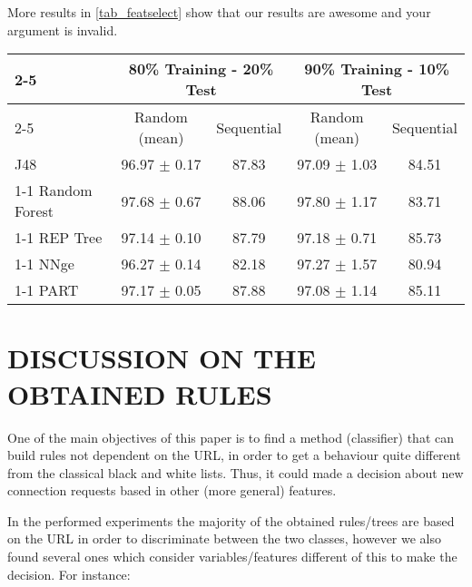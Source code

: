 \documentclass{llncs}
\begin{document}


More results in \ref{tab_featselect} show that our results are awesome and your argument is invalid.

\begin{table*}[htpb]
\centering
 \caption{\label{tab_featselect} Percentage of correctly classified patterns for non-balanced data}
{\small
\begin{tabular}{|l|c|c|c|c|}
\cline{2-5}
\multicolumn{1}{l|}{} & \multicolumn{2}{c|}{80\% Training - 20\% Test} & \multicolumn{2}{c|}{90\% Training - 10\% Test} \\ 
\cline{2-5}
\multicolumn{1}{l|}{} & Random (mean) & Sequential & Random (mean) & Sequential \\ 
\hline
J48 & 96.97 $\pm$ 0.17 & 87.83 & 97.09 $\pm$ 1.03 & 84.51 \\ 
\cline{1-1}
Random Forest & 97.68 $\pm$ 0.67 & 88.06 & 97.80 $\pm$ 1.17 & 83.71 \\ 
\cline{1-1}
REP Tree & 97.14 $\pm$ 0.10 & 87.79 & 97.18 $\pm$ 0.71 & 85.73 \\ 
\cline{1-1}
NNge & 96.27 $\pm$ 0.14 & 82.18 & 97.27 $\pm$ 1.57 & 80.94 \\ 
\cline{1-1}
PART & 97.17 $\pm$ 0.05 & 87.88 & 97.08 $\pm$ 1.14 & 85.11 \\ 
\hline
\end{tabular}
}
\end{table*}

%
\section{\uppercase{Discussion on the Obtained Rules}}
\label{sec:rulesdiscussion}

One of the main objectives of this paper is to find a method (classifier) that can build rules not dependent on the URL, in order to get a behaviour quite different from the classical black and white lists. Thus, it could made a decision about new connection requests based in other (more general) features.

In the performed experiments the majority of the obtained rules/trees are based on the URL in order to discriminate between the two classes, however we also found several ones which consider variables/features different of this to make the decision. For instance:\\
\end{document}
